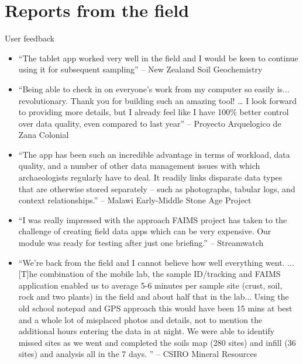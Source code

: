 \documentclass[aspectratio=169, 12pt]{beamer} %
\begin{document}
\section{Reports from the field}

\begin{frame}[allowframebreaks]{User feedback}
    \begin{itemize}[label=\textbullet]
        \item ``The tablet app worked very well in the field and I would be keen to continue using it for subsequent sampling'' -- New Zealand Soil Geochemistry
        \item ``Being able to check in on everyone's work from my computer so easily is... revolutionary. Thank you for building such an amazing tool! …  I look forward to providing more details, but I already feel like I have 100\%{} better control over data quality, even compared to last year'' -- Proyecto Arquelogico de Zana Colonial
        \item ``The app has been such an incredible advantage in terms of workload, data quality, and a number of other data management issues with which archaeologists regularly have to deal. It readily links disparate data types that are otherwise stored separately – such as photographs, tabular logs, and context relationships.'' -- Malawi Early-Middle Stone Age Project
        \item ``I was really impressed with the approach FAIMS project has taken to the challenge of creating field data apps which can be very expensive. Our module was ready for testing after just one briefing.'' -- Streamwatch
        \item ``We’re back from the field and I cannot believe how well everything went. ... [T]he combination of the mobile lab, the sample ID/tracking and FAIMS application enabled us to average 5-6 minutes per sample site (crust, soil, rock and two plants)  in the field and about half that in the lab... Using the old school notepad and GPS approach this would have been 15 mins at best and a whole lot of misplaced photos and details, not to mention the additional hours entering the data in at night. We were able to identify missed sites as we went and completed the soils map (280 sites) and infill (36 sites) and analysis all in the 7 days. '' -- CSIRO Mineral Resources
    \end{itemize}
\end{frame}
\end{document}
